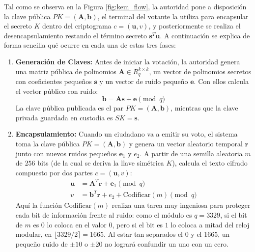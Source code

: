 Tal como se observa en la Figura \ref{fig:kem_flow}, la autoridad pone a disposición la clave pública $PK = (\mathbf{A}, \mathbf{b})$, el terminal del votante la utiliza para encapsular el secreto $K$ dentro del criptograma $c = (\mathbf{u}, v)$, y posteriormente se realiza el desencapsulamiento restando el término secreto $\mathbf{s}^T\mathbf{u}$. A continuación se explica de forma sencilla qué ocurre en cada una de estas tres fases:

\begin{enumerate}
	\item \textbf{Generación de Claves:}
	Antes de iniciar la votación, la autoridad genera una matriz pública de polinomios $\mathbf{A} \in R_q^{k \times k}$, un vector de polinomios secretos con coeficientes pequeños $\mathbf{s}$ y un vector de ruido pequeño $\mathbf{e}$. Con ellos calcula el vector público con ruido:
	\begin{equation}
		\mathbf{b} = \mathbf{A}\mathbf{s} + \mathbf{e} \pmod q
	\end{equation}
	La clave pública publicada es el par $PK = (\mathbf{A}, \mathbf{b})$, mientras que la clave privada guardada en custodia es $SK = \mathbf{s}$.

	\item \textbf{Encapsulamiento:}
	Cuando un ciudadano va a emitir su voto, el sistema toma la clave pública $PK = (\mathbf{A}, \mathbf{b})$ y genera un vector aleatorio temporal $\mathbf{r}$ junto con nuevos ruidos pequeños $\mathbf{e}_1$ y $e_2$. A partir de una semilla aleatoria $m$ de $256$ bits (de la cual se deriva la llave simétrica $K$), calcula el texto cifrado compuesto por dos partes $c = (\mathbf{u}, v)$:
	\begin{align}
		\mathbf{u} &= \mathbf{A}^T \mathbf{r} + \mathbf{e}_1 \pmod q \\
		v &= \mathbf{b}^T \mathbf{r} + e_2 + \text{Codificar}(m) \pmod q
	\end{align}
	Aquí la función $\text{Codificar}(m)$ realiza una tarea muy ingeniosa para proteger cada bit de información frente al ruido: como el módulo es $q = 3329$, si el bit de $m$ es $0$ lo coloca en el valor $0$, pero si el bit es $1$ lo coloca a mitad del reloj modular, en $\lfloor 3329 / 2 \rceil = 1665$. Al estar tan separados el $0$ y el $1665$, un pequeño ruido de $\pm 10$ o $\pm 20$ no logrará confundir un uno con un cero.


\end{enumerate}
